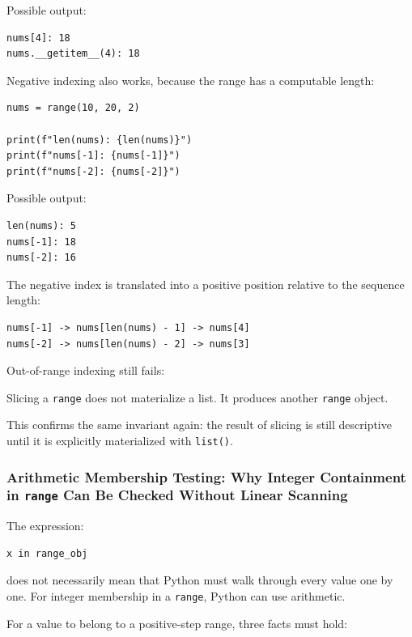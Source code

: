 Possible output:

\begin{verbatim}
nums[4]: 18
nums.__getitem__(4): 18
\end{verbatim}

Negative indexing also works, because the range has a computable length:

\begin{verbatim}
nums = range(10, 20, 2)

print(f"len(nums): {len(nums)}")
print(f"nums[-1]: {nums[-1]}")
print(f"nums[-2]: {nums[-2]}")
\end{verbatim}

Possible output:

\begin{verbatim}
len(nums): 5
nums[-1]: 18
nums[-2]: 16
\end{verbatim}

The negative index is translated into a positive position relative to the sequence length:

\begin{verbatim}
nums[-1] -> nums[len(nums) - 1] -> nums[4]
nums[-2] -> nums[len(nums) - 2] -> nums[3]
\end{verbatim}

Out-of-range indexing still fails:

Slicing a \texttt{range} does not materialize a list. It produces another \texttt{range} object.

This confirms the same invariant again: the result of slicing is still descriptive until it is explicitly materialized with \texttt{list()}.

\subsubsection{Arithmetic Membership Testing: Why Integer Containment in \texttt{range} Can Be Checked Without Linear Scanning}

The expression:

\begin{verbatim}
x in range_obj
\end{verbatim}

does not necessarily mean that Python must walk through every value one by one. For integer membership in a \texttt{range}, Python can use arithmetic.

For a value to belong to a positive-step range, three facts must hold:

